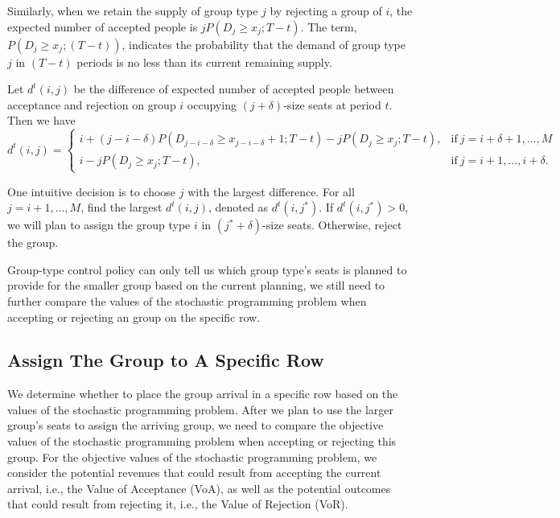 Similarly, when we retain the supply of group type $j$ by rejecting a group of $i$, the expected number of accepted people is $j P(D_{j} \geq x_{j}; T-t)$. The term, $P(D_{j} \geq x_{j}; (T-t))$, indicates the probability that the demand of group type $j$ in $(T-t)$ periods is no less than its current remaining supply.

Let $d^{t}(i,j)$ be the difference of expected number of accepted people between acceptance and rejection on group $i$ occupying $(j+\delta)$-size seats at period $t$. Then we have
\begin{equation*}
	d^{t}(i,j) = \begin{cases}
    i + (j-i-\delta)P(D_{j-i-\delta} \geq x_{j-i-\delta}+1; T-t) - j P(D_{j} \geq x_{j}; T-t), &\text{if}~ j = i+\delta+1, \ldots, M \\
    i - j P(D_{j} \geq x_{j}; T-t), &\text{if}~ j = i+1, \ldots, i+\delta.
		\end{cases}
\end{equation*}



One intuitive decision is to choose $j$ with the largest difference. For all $j = i+1, \ldots, M$, find the largest $d^{t}(i,j)$, denoted as $d^{t}(i,j^{*})$. If $d^{t}(i,j^{*}) >0$, we will plan to assign the group type $i$ in $(j^{*}+\delta)$-size seats. Otherwise, reject the group.

Group-type control policy can only tell us which group type's seats is planned to provide for the smaller group based on the current planning, we still need to further compare the values of the stochastic programming problem when accepting or rejecting an group on the specific row. 


\subsection{Assign The Group to A Specific Row}
We determine whether to place the group arrival in a specific row based on the values of the stochastic programming problem. After we plan to use the larger group's seats to assign the arriving group, we need to compare the objective values of the stochastic programming problem when accepting or rejecting this group. For the objective values of the stochastic programming problem, we consider the potential revenues that could result from accepting the current arrival, i.e., the Value of Acceptance (VoA), as well as the potential outcomes that could result from rejecting it, i.e., the Value of Rejection (VoR).

